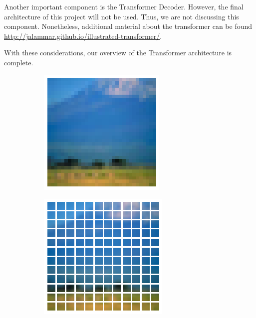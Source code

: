 Another important component is the Transformer Decoder. However, the final architecture of this project will not be used. Thus, we are not discussing this component. Nonetheless, additional material about the transformer can be found \url{http://jalammar.github.io/illustrated-transformer/}.

With these considerations, our overview of the Transformer architecture is complete.
\begin{figure}
    \begin{subfigure}{.5\textwidth}
        \centering
        \includegraphics[width=.9\linewidth]{figs/fullimage.png}
    \end{subfigure}
    \begin{subfigure}{.5\textwidth}
        \centering
        \includegraphics[width=.9\linewidth]{figs/patchedimage.png}

\end{subfigure}
\end{figure}
